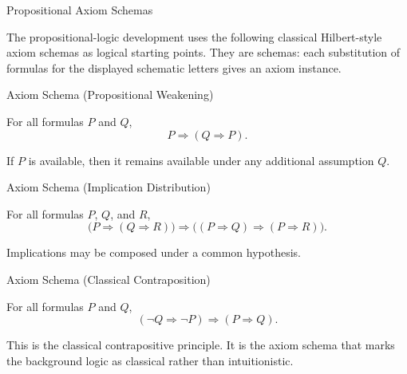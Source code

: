 \begin{topicbox}{Propositional Axiom Schemas}
\begin{exposition}
The propositional-logic development uses the following classical Hilbert-style
axiom schemas as logical starting points. They are schemas: each substitution
of formulas for the displayed schematic letters gives an axiom instance.
\end{exposition}
\end{topicbox}

\begin{axiombox}{Axiom Schema (Propositional Weakening)}
\begin{axiom}
\label{ax:propositional-weakening}
For all formulas $P$ and $Q$,
\[
P \Longrightarrow (Q \Longrightarrow P).
\]
\end{axiom}
\end{axiombox}

\begin{remark*}[Interpretation]
If $P$ is available, then it remains available under any additional
assumption $Q$.
\end{remark*}

\NoLocalDependencies

\begin{axiombox}{Axiom Schema (Implication Distribution)}
\begin{axiom}
\label{ax:propositional-implication-distribution}
For all formulas $P$, $Q$, and $R$,
\[
\bigl(P \Longrightarrow (Q \Longrightarrow R)\bigr)
\Longrightarrow
\bigl((P \Longrightarrow Q) \Longrightarrow (P \Longrightarrow R)\bigr).
\]
\end{axiom}
\end{axiombox}

\begin{remark*}[Interpretation]
Implications may be composed under a common hypothesis.
\end{remark*}

\NoLocalDependencies

\begin{axiombox}{Axiom Schema (Classical Contraposition)}
\begin{axiom}
\label{ax:propositional-classical-contraposition}
For all formulas $P$ and $Q$,
\[
(\neg Q \Longrightarrow \neg P) \Longrightarrow (P \Longrightarrow Q).
\]
\end{axiom}
\end{axiombox}

\begin{remark*}[Interpretation]
This is the classical contrapositive principle. It is the axiom schema that
marks the background logic as classical rather than intuitionistic.
\end{remark*}

\NoLocalDependencies
